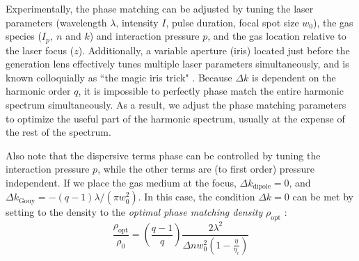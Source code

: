 Experimentally, the phase matching can be adjusted by tuning the laser parameters (wavelength $\lambda$, intensity $I$, pulse duration, focal spot size $w_0$), the gas species ($I_p, \ n$ and $k$) and interaction pressure $p$, and the gas location relative to the laser focus ($z$). Additionally, a variable aperture (iris) located just before the generation lens effectively tunes multiple laser parameters simultaneously, and is known colloquially as ``the magic iris trick" \cite{kazamiasHighOrderHarmonic2002}. Because $\Delta k$ is dependent on the harmonic order $q$, it is impossible to perfectly phase match the entire harmonic spectrum simultaneously. As a result, we adjust the phase matching parameters to optimize the useful part of the harmonic spectrum, usually at the expense of the rest of the spectrum.

Also note that the dispersive terms phase can be controlled by tuning the interaction pressure $p$, while the other terms are (to first order) pressure independent. If we place the gas medium at the focus, $\Delta k_{\textrm{dipole}} = 0$, and $\Delta k_{\textrm{Gouy}} = -(q-1) \lambda / (\pi w_0^2)$. In this case, the condition $\Delta k = 0$ can be met by setting to the density to the \textit{optimal phase matching density} $\rho_{\textrm{opt}}$ \cite{rothhardtAbsorptionlimitedPhasematchedHigh2014,pupeikisWaterWindowSoft2020}:
\begin{equation}
\frac{\rho_{\textrm{opt}}}{\rho_0} = \left( \frac{q-1}{q} \right) \frac{2 \lambda^2}{\Delta n w_0^2 \left(1 - \frac{\eta}{\eta_c}\right)}
\label{eqn:phase_matching_density}
\end{equation}

